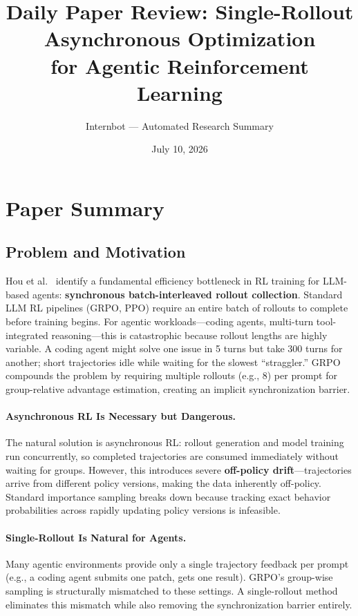 \documentclass[11pt,a4paper]{article}
\title{Daily Paper Review: Single-Rollout Asynchronous Optimization\\for Agentic Reinforcement Learning}
\author{Internbot --- Automated Research Summary}
\date{July 10, 2026}
\begin{document}
\maketitle

\section{Paper Summary}

\subsection{Problem and Motivation}

Hou et al.~\cite{hou2026sao} identify a fundamental efficiency bottleneck in RL training for LLM-based agents: \textbf{synchronous batch-interleaved rollout collection}. Standard LLM RL pipelines (GRPO, PPO) require an entire batch of rollouts to complete before training begins. For agentic workloads---coding agents, multi-turn tool-integrated reasoning---this is catastrophic because rollout lengths are highly variable. A coding agent might solve one issue in 5 turns but take 300 turns for another; short trajectories idle while waiting for the slowest ``straggler.'' GRPO compounds the problem by requiring multiple rollouts (e.g., 8) per prompt for group-relative advantage estimation, creating an implicit synchronization barrier.

\paragraph{Asynchronous RL Is Necessary but Dangerous.} The natural solution is asynchronous RL: rollout generation and model training run concurrently, so completed trajectories are consumed immediately without waiting for groups. However, this introduces severe \textbf{off-policy drift}---trajectories arrive from different policy versions, making the data inherently off-policy. Standard importance sampling breaks down because tracking exact behavior probabilities across rapidly updating policy versions is infeasible.

\paragraph{Single-Rollout Is Natural for Agents.} Many agentic environments provide only a single trajectory feedback per prompt (e.g., a coding agent submits one patch, gets one result). GRPO's group-wise sampling is structurally mismatched to these settings. A single-rollout method eliminates this mismatch while also removing the synchronization barrier entirely.
\end{document}
